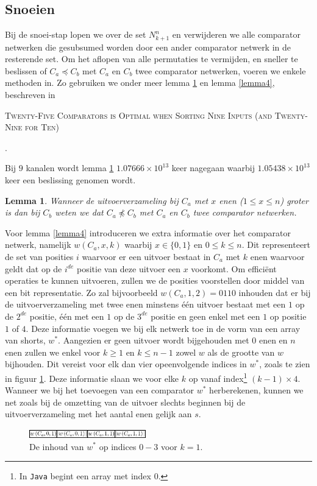 \documentclass{article}
\newtheorem{lemma}{Lemma}
\begin{document}
\subsection{Snoeien}\label{Snoeien}
Bij de snoei-stap lopen we over de set $N^n_{k+1}$ en verwijderen we alle comparator netwerken die gesubsumed worden door een ander comparator netwerk in de resterende set.
Om het aflopen van alle permutaties te vermijden, en sneller te beslissen of $C_a \preceq C_b$ met $C_a$ en $C_b$ twee comparator netwerken, voeren we enkele methoden in.
Zo gebruiken we onder meer lemma \ref{lemma3} en lemma \ref{lemma4}, beschreven in 
\begin{small}
\textsc{Twenty-Five Comparators is Optimal when Sorting Nine Inputs (and Twenty-Nine for Ten)}
\end{small}
\cite{sortingNetworksSize2014}.

Bij $9$ kanalen wordt lemma \ref{lemma3} $1.07666 \times 10^{13}$ keer nagegaan waarbij $1.05438 \times 10^{13}$ keer een beslissing genomen wordt.
\begin{lemma}
	Wanneer de uitvoerverzameling bij $C_a$ met $x$ enen ($1 \leq x \leq n$) groter is dan bij $C_b$ weten we dat $C_a \npreceq C_b$ met $C_a$ en $C_b$ twee comparator netwerken.
\label{lemma3}
\end{lemma}
Voor lemma \ref{lemma4} introduceren we extra informatie over het comparator netwerk, namelijk $w\left(C_a, x, k\right)$ waarbij ${x \in \{0,1\}}$ en $0\leq k \leq n$.
Dit representeert de set van posities $i$ waarvoor er een uitvoer bestaat in $C_a$ met $k$ enen waarvoor geldt dat op de $i^{de}$ positie van deze uitvoer een $x$ voorkomt.
Om effici\"ent operaties te kunnen uitvoeren, zullen we de posities voorstellen door middel van een bit representatie.
Zo zal bijvoorbeeld $w\left(C_a, 1, 2\right) = 0110$ inhouden dat er bij de uitvoerverzameling met twee enen minstens \'e\'en uitvoer bestaat met een $1$ op de $2^{de}$ positie, \'e\'en met een $1$ op de $3^{de}$ positie en geen enkel met een $1$ op positie $1$ of $4$.
Deze informatie voegen we bij elk netwerk toe in de vorm van een array van shorts, $w^*$.
Aangezien er geen uitvoer wordt bijgehouden met $0$ enen en $n$ enen zullen we enkel voor $k \geq 1 $ en $k \leq n-1$ zowel $w$ als de grootte van $w$ bijhouden.
Dit vereist voor elk dan vier opeenvolgende indices in $w^*$, zoals te zien in figuur \ref{tabel3}.
Deze informatie slaan we voor elke $k$ op vanaf index\footnote{In \texttt{Java} begint een array met index $0$.} $(k-1) \times 4$.
Wanneer we bij het toevoegen van een comparator $w^*$ herberekenen, kunnen we net zoals bij de omzetting van de uitvoer slechts beginnen bij de uitvoerverzameling met het aantal enen gelijk aan $s$.
\begin{figure}[!h]
	\centering
	\includegraphics[width = 0.45\textwidth]{Tabel3_OpbouwW.png}
	\caption{De inhoud van $w^*$ op indices $0-3$ voor $k = 1$.}
	\label{tabel3} 
\end{figure}
\end{document}
